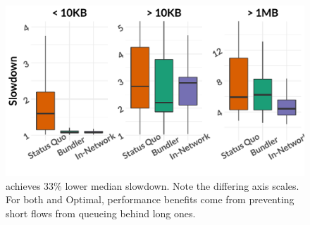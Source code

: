 \begin{figure}
    \centering
\begin{knitrout}
\color{fgcolor}
\includegraphics[width=\maxwidth]{figure/eval:best-1} 

\end{knitrout}
    \caption{\name achieves 33\% lower median slowdown. Note the differing axis scales. For both \name and Optimal, performance benefits come from preventing short flows from queueing behind long ones.}
    \label{fig:eval:best}
\end{figure}
\newcommand{\overviewBenefitsBaselineMedian}{1.62\xspace}
\newcommand{\overviewBenefitsBaselineTail}{10.77\xspace}
\newcommand{\overviewBenefitsBundlerMedian}{1.08\xspace}
\newcommand{\overviewBenefitsBundlerTail}{9.84\xspace}
\newcommand{\overviewBenefitsOptimalMedian}{1.08\xspace}
\newcommand{\overviewBenefitsOptimalTail}{4.46\xspace}
\newcommand{\overviewBenefitsBundlerMedianImprovement}{33\%\xspace}
